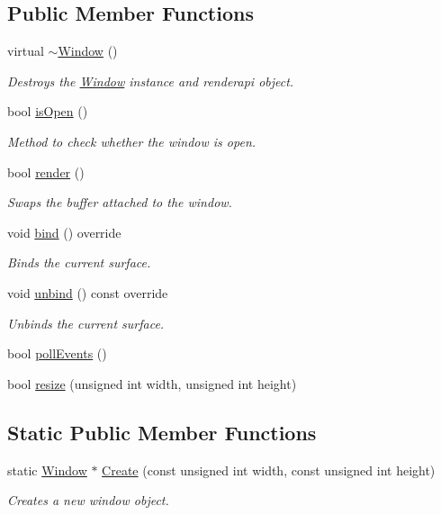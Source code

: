 \subsection*{Public Member Functions}
\begin{DoxyCompactItemize}
\item 
virtual \hyperlink{classpcs_1_1Window_a579734a5cb40ca904947eed2f5a853bf}{$\sim$\+Window} ()
\begin{DoxyCompactList}\small\item\em Destroys the \hyperlink{classpcs_1_1Window}{Window} instance and renderapi object. \end{DoxyCompactList}\item 
bool \hyperlink{classpcs_1_1Window_a594d19fb488754f3e863e982ad540928}{is\+Open} ()
\begin{DoxyCompactList}\small\item\em Method to check whether the window is open. \end{DoxyCompactList}\item 
bool \hyperlink{classpcs_1_1Window_a13464abf63b4b42578628ac0e7f2a141}{render} ()
\begin{DoxyCompactList}\small\item\em Swaps the buffer attached to the window. \end{DoxyCompactList}\item 
void \hyperlink{classpcs_1_1Window_aa6e00bee6910b3146481dee7aab69cfb}{bind} () override
\begin{DoxyCompactList}\small\item\em Binds the current surface. \end{DoxyCompactList}\item 
void \hyperlink{classpcs_1_1Window_a4d103be3712fbb051d7c4d446a266de0}{unbind} () const override
\begin{DoxyCompactList}\small\item\em Unbinds the current surface. \end{DoxyCompactList}\item 
bool \hyperlink{classpcs_1_1Window_a3017fae4b567ecad9f41189b9b8f0281}{poll\+Events} ()
\item 
bool \hyperlink{classpcs_1_1Window_a4918cb448c1b50b85b2cd5cbcb2d767e}{resize} (unsigned int width, unsigned int height)
\end{DoxyCompactItemize}
\subsection*{Static Public Member Functions}
\begin{DoxyCompactItemize}
\item 
static \hyperlink{classpcs_1_1Window}{Window} $\ast$ \hyperlink{classpcs_1_1Window_af7ab7d729e559b42fb723c57670623da}{Create} (const unsigned int width, const unsigned int height)
\begin{DoxyCompactList}\small\item\em Creates a new window object. \end{DoxyCompactList}\end{DoxyCompactItemize}
